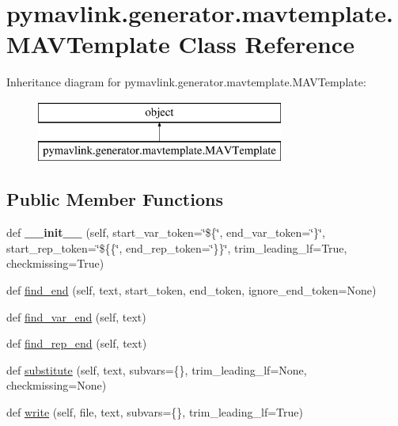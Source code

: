 \hypertarget{classpymavlink_1_1generator_1_1mavtemplate_1_1MAVTemplate}{}\section{pymavlink.\+generator.\+mavtemplate.\+M\+A\+V\+Template Class Reference}
\label{classpymavlink_1_1generator_1_1mavtemplate_1_1MAVTemplate}
Inheritance diagram for pymavlink.\+generator.\+mavtemplate.\+M\+A\+V\+Template\+:\begin{figure}[H]
\begin{center}
\leavevmode
\includegraphics[height=2.000000cm]{classpymavlink_1_1generator_1_1mavtemplate_1_1MAVTemplate}
\end{center}
\end{figure}
\subsection*{Public Member Functions}
\begin{DoxyCompactItemize}
\item 
\mbox{\label{classpymavlink_1_1generator_1_1mavtemplate_1_1MAVTemplate_ab207ac14ad832a9a2ff313e32a8abf43}} 
def {\bfseries \+\_\+\+\_\+init\+\_\+\+\_\+} (self, start\+\_\+var\+\_\+token=\char`\"{}\$\{\char`\"{}, end\+\_\+var\+\_\+token=\char`\"{}\}\char`\"{}, start\+\_\+rep\+\_\+token=\char`\"{}\$\{\{\char`\"{}, end\+\_\+rep\+\_\+token=\char`\"{}\}\}\char`\"{}, trim\+\_\+leading\+\_\+lf=True, checkmissing=True)
\item 
def \hyperlink{classpymavlink_1_1generator_1_1mavtemplate_1_1MAVTemplate_a4a97cc1d4bfbd4e32953f364507fada8}{find\+\_\+end} (self, text, start\+\_\+token, end\+\_\+token, ignore\+\_\+end\+\_\+token=None)
\item 
def \hyperlink{classpymavlink_1_1generator_1_1mavtemplate_1_1MAVTemplate_a627b9f64b13bece04d2711ce25beaba2}{find\+\_\+var\+\_\+end} (self, text)
\item 
def \hyperlink{classpymavlink_1_1generator_1_1mavtemplate_1_1MAVTemplate_ac653ff2519c9aa35c4ae2df3f97114c5}{find\+\_\+rep\+\_\+end} (self, text)
\item 
def \hyperlink{classpymavlink_1_1generator_1_1mavtemplate_1_1MAVTemplate_adf6f114f842c14ecb4f8b41a0eeba60c}{substitute} (self, text, subvars=\{\}, trim\+\_\+leading\+\_\+lf=None, checkmissing=None)
\item 
def \hyperlink{classpymavlink_1_1generator_1_1mavtemplate_1_1MAVTemplate_a8d8b9f9e281c877cad428f3a28ae61d0}{write} (self, file, text, subvars=\{\}, trim\+\_\+leading\+\_\+lf=True)
\end{DoxyCompactItemize}
